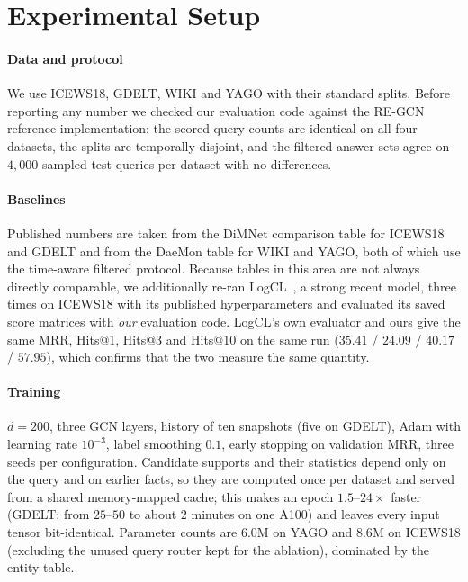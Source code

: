 \documentclass[conference]{IEEEtran}
\begin{document}
\section{Experimental Setup}
\label{sec:setup}

\paragraph{Data and protocol}
We use ICEWS18, GDELT, WIKI and YAGO with their standard splits. Before
reporting any number we checked our evaluation code against the RE-GCN
reference implementation: the scored query counts are identical on all four
datasets, the splits are temporally disjoint, and the filtered answer sets
agree on $4{,}000$ sampled test queries per dataset with no differences.

\paragraph{Baselines}
Published numbers are taken from the DiMNet comparison table for ICEWS18 and
GDELT and from the DaeMon table for WIKI and YAGO, both of which use the
time-aware filtered protocol. Because tables in this area are not always
directly comparable, we additionally re-ran LogCL~\cite{logcl}, a strong recent
model, three times on ICEWS18 with its published hyperparameters and evaluated
its saved score matrices with \emph{our} evaluation code. LogCL's own evaluator
and ours give the same MRR, Hits@1, Hits@3 and Hits@10 on the same run
($35.41$ / $24.09$ / $40.17$ / $57.95$),
which confirms that the two measure the same quantity.

\paragraph{Training}
$d = 200$, three GCN layers, history of ten snapshots (five on GDELT), Adam
with learning rate $10^{-3}$, label smoothing $0.1$, early stopping on
validation MRR, three seeds per configuration. Candidate supports and their
statistics depend only on the query and on earlier facts, so they are computed
once per dataset and served from a shared memory-mapped cache; this makes an
epoch $1.5$--$24\times$ faster (GDELT: from $25$--$50$ to about $2$ minutes on
one A100) and leaves every input tensor bit-identical. Parameter counts are
$6.0$M on YAGO and $8.6$M on ICEWS18 (excluding the unused query router
kept for the ablation), dominated by the entity table.
\end{document}
